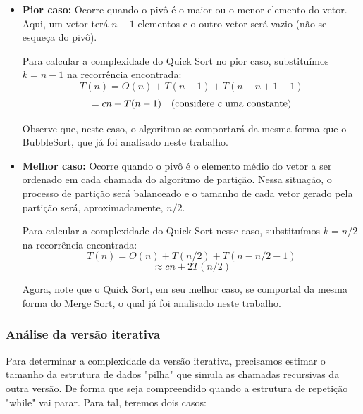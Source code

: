 \begin{itemize}
	\item \textbf{Pior caso:} Ocorre quando o pivô é o maior ou o menor elemento do vetor. Aqui, um vetor terá \( n-1 \) elementos e o outro vetor será vazio (não se esqueça do pivô).

	      Para calcular a complexidade do Quick Sort no pior caso, substituímos \( k = n - 1 \) na recorrência encontrada:
	      \[
		      T(n) = O(n) + T(n-1) + T(n - n + 1 - 1)
	      \]
	      \[
		      = cn + T(n-1) \quad \text{(considere \( c \) uma constante)}
	      \]

	      Observe que, neste caso, o algoritmo se comportará da mesma forma que o BubbleSort, que já foi analisado neste trabalho.

	\item \textbf{Melhor caso:} Ocorre quando o pivô é o elemento médio do vetor a ser ordenado em cada chamada do algoritmo de partição. Nessa situação, o processo de partição será balanceado e o tamanho de cada vetor gerado pela partição será, aproximadamente, \( n/2 \).

	      Para calcular a complexidade do Quick Sort nesse caso, substituímos \( k = n/2 \) na recorrência encontrada:
	      \[
		      T(n) = O(n) + T(n/2) + T(n - n/2 - 1)
	      \]
	      \[
		      \approx cn + 2T(n/2)
	      \]

	      Agora, note que o Quick Sort, em seu melhor caso, se comportal da mesma forma do Merge Sort, o qual já foi analisado neste trabalho.

\end{itemize}

\subsubsection{Análise da versão iterativa}

Para determinar a complexidade da versão iterativa, precisamos estimar o tamanho da estrutura de dados "pilha" que simula as chamadas recursivas da outra versão. De forma que seja compreendido quando a estrutura de repetição "while" vai parar. Para tal, teremos dois casos:

